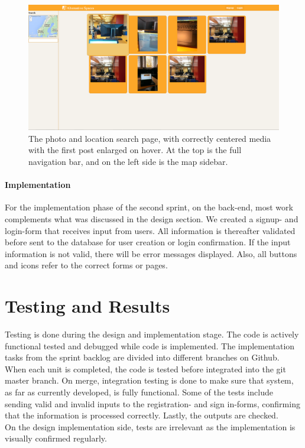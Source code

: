 \begin{figure}[ht!]
\centering
\includegraphics[width={\linewidth}]{Sprint2/img/Sprint2-PhotoPage.png}
\caption{The photo and location search page, with correctly centered media with the first post enlarged on hover. At the top is the full navigation bar, and on the left side is the map sidebar. \label{overflow}}
\end{figure}


\paragraph{Implementation}
For the implementation phase of the second sprint, on the back-end, most work complements what was discussed in the design section. We created a signup- and login-form that receives input from users. All information is thereafter validated before sent to the database for user creation or login confirmation. If the input information is not valid, there will be error messages displayed. Also, all buttons and icons refer to the correct forms or pages. 

\section{Testing and Results}
Testing is done during the design and implementation stage. The code is actively functional tested and debugged while code is implemented. The implementation tasks from the sprint backlog are divided into different branches on Github. When each unit is completed, the code is tested before integrated into the git master branch. On merge, integration testing is done to make sure that system, as far as currently developed, is fully functional. Some of the tests include sending valid and invalid inputs to the registration- and sign in-forms, confirming that the information is processed correctly. Lastly, the outputs are checked. \\
On the design implementation side, tests are irrelevant as the implementation is visually confirmed regularly. 


